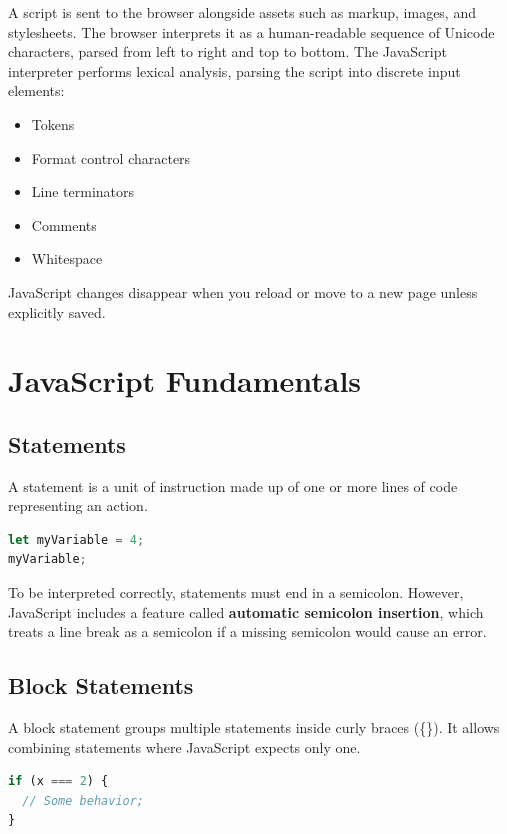 \documentclass[a4paper,12pt]{article}
\begin{document}
A script is sent to the browser alongside assets such as markup, images, and stylesheets. The browser interprets it as a human-readable sequence of Unicode characters, parsed from left to right and top to bottom. The JavaScript interpreter performs lexical analysis, parsing the script into discrete input elements:

\begin{itemize}
    \item Tokens
    \item Format control characters
    \item Line terminators
    \item Comments
    \item Whitespace
\end{itemize}

JavaScript changes disappear when you reload or move to a new page unless explicitly saved.

\section{JavaScript Fundamentals}
\subsection{Statements}
A statement is a unit of instruction made up of one or more lines of code representing an action.

\begin{lstlisting}[language=JavaScript, caption=Example of a Statement]
let myVariable = 4;
myVariable;
\end{lstlisting}

To be interpreted correctly, statements must end in a semicolon. However, JavaScript includes a feature called \textbf{automatic semicolon insertion}, which treats a line break as a semicolon if a missing semicolon would cause an error.

\subsection{Block Statements}
A block statement groups multiple statements inside curly braces (\{\}). It allows combining statements where JavaScript expects only one.

\begin{lstlisting}[language=JavaScript, caption=Example of a Block Statement]
if (x === 2) {
  // Some behavior;
}
\end{lstlisting}
\end{document}
